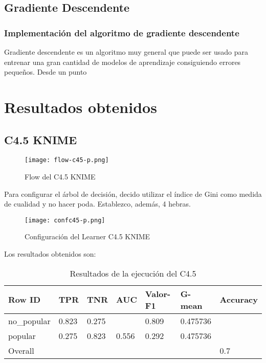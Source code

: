 \subsection{Gradiente Descendente}

\subsubsection{Implementación del algoritmo de gradiente descendente}

Gradiente descendente es un algoritmo muy general que puede ser usado para entrenar una gran cantidad de modelos de aprendizaje consiguiendo errores pequeños. Desde un punto 

\section{Resultados obtenidos}

\subsection{C4.5 KNIME}

\begin{figure}[H] %
	\centering
	\texttt{[image: flow-c45-p.png]}  %
	\caption{Flow del C4.5 KNIME} 
	\label{fig:flowc4.5}
\end{figure}



Para configurar el árbol de decisión, decido utilizar el índice de Gini como medida de cualidad y no hacer poda. Establezco, además, 4 hebras.

\begin{figure}[H] %
	\centering
	\texttt{[image: confc45-p.png]}  %
	\caption{Configuración del Learner C4.5 KNIME} 
	\label{fig:confc45-p}
\end{figure}

Los resultados obtenidos son:

\begin{table}[H]
	\centering
	\begin{tabular}{|l|l|l|l|l|l|l|}
		\hline
		Row ID      & TPR   & TNR   & AUC   & Valor-F1 & G-mean   & Accuracy \\ \hline
		no\_popular & 0.823 & 0.275 &       & 0.809    & 0.475736 &          \\ \hline
		popular     & 0.275 & 0.823 & 0.556 & 0.292    & 0.475736 &          \\ \hline
		Overall     &       &       &       &          &          & 0.7      \\ \hline
	\end{tabular}
	\caption{Resultados de la ejecución del C4.5}
	\label{tab:c45}
\end{table}

